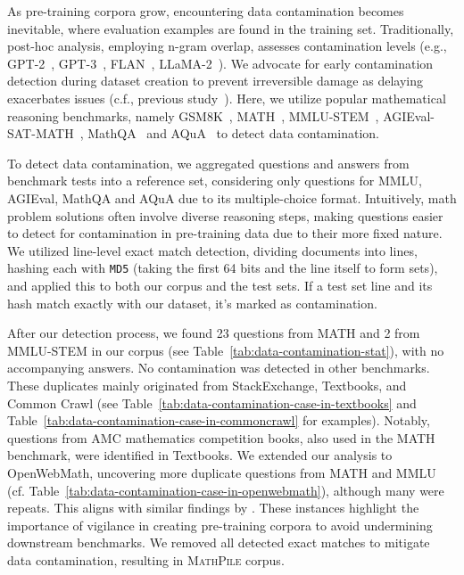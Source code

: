 As pre-training corpora grow, encountering data contamination becomes inevitable, where evaluation examples are found in the training set. Traditionally, post-hoc analysis, employing n-gram overlap, assesses contamination levels (e.g., GPT-2~\citep{radford2019gpt-2}, GPT-3~\citep{DBLP:conf/nips/BrownMRSKDNSSAA20-gpt-3}, FLAN~\citep{DBLP:conf/iclr/WeiBZGYLDDL22-FLAN}, LLaMA-2~\citep{DBLP:journals/corr/abs-2307-09288-llama-2}).  We advocate for early contamination detection during dataset creation to prevent irreversible damage as delaying exacerbates issues (c.f., previous study~\citep{DBLP:journals/corr/abs-2211-15533-stack}). Here, we utilize popular mathematical reasoning benchmarks, namely GSM8K~\citep{DBLP:journals/corr/abs-2110-14168-GSM8K}, MATH~\citep{DBLP:conf/nips/HendrycksBKABTS21-math}, MMLU-STEM~\citep{DBLP:conf/iclr/HendrycksBBZMSS21-MMLU}, AGIEval-SAT-MATH~\citep{DBLP:journals/corr/abs-2304-06364-agieval}, MathQA~\citep{DBLP:conf/naacl/AminiGLKCH19-mathqa} and AQuA~\citep{ling-etal-2017-program-aqua} to detect data contamination. 

To detect data contamination, we aggregated questions and answers from benchmark tests into a reference set, considering only questions for MMLU, AGIEval, MathQA and AQuA due to its multiple-choice format. Intuitively, math problem solutions often involve diverse reasoning steps, making questions easier to detect for contamination in pre-training data due to their more fixed nature. We utilized line-level exact match detection, dividing documents into lines, hashing each with \texttt{MD5} (taking the first 64 bits and the line itself to form sets), and applied this to both our corpus and the test sets. If a test set line and its hash match exactly with our dataset, it's marked as contamination.

After our detection process, we found 23 questions from MATH and 2 from MMLU-STEM in our corpus (see Table~\ref{tab:data-contamination-stat}), with no accompanying answers. No contamination was detected in other benchmarks. These duplicates mainly originated from StackExchange, Textbooks, and Common Crawl (see Table~\ref{tab:data-contamination-case-in-textbooks} and Table~\ref{tab:data-contamination-case-in-commoncrawl} for examples). Notably, questions from AMC mathematics competition books, also used in the MATH benchmark, were identified in Textbooks. We extended our analysis to OpenWebMath, uncovering more duplicate questions from MATH and MMLU (cf. Table~\ref{tab:data-contamination-case-in-openwebmath}), although many were repeats. This aligns with similar findings by \citet{DBLP:journals/corr/abs-2310-10631-proofpile-2}. These instances highlight the importance of vigilance in creating pre-training corpora to avoid undermining downstream benchmarks. We removed all detected exact matches to mitigate data contamination, resulting in {\textsc{MathPile }} corpus.

